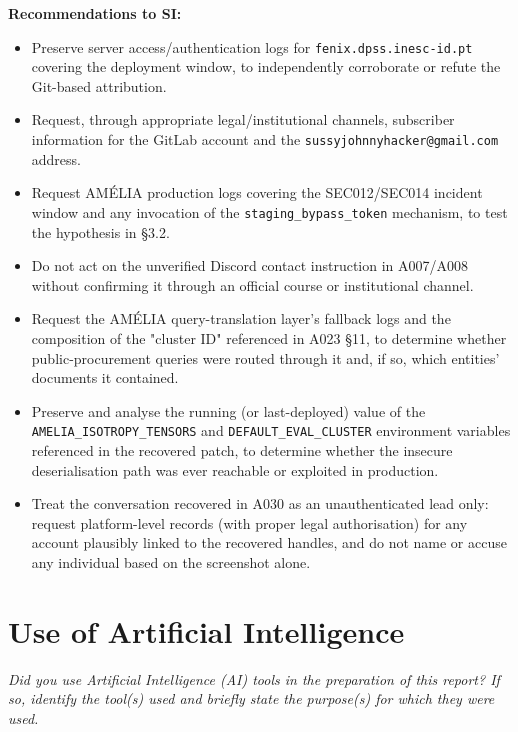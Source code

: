 \documentclass[11pt,a4paper,final,oneside]{article}
\begin{document}
\textbf{Recommendations to SI:}
\begin{itemize}
\item Preserve server access/authentication logs for \texttt{fenix.dpss.inesc-id.pt} covering
  the deployment window, to independently corroborate or refute the Git-based attribution.
\item Request, through appropriate legal/institutional channels, subscriber information for the
  GitLab account and the \texttt{sussyjohnnyhacker@gmail.com} address.
\item Request AMÉLIA production logs covering the SEC012/SEC014 incident window and any
  invocation of the \texttt{staging\_bypass\_token} mechanism, to test the hypothesis in §3.2.
\item Do not act on the unverified Discord contact instruction in A007/A008 without confirming
  it through an official course or institutional channel.
\item Request the AMÉLIA query-translation layer's fallback logs and the composition of the
  "cluster ID" referenced in A023 §11, to determine whether public-procurement queries were
  routed through it and, if so, which entities' documents it contained.
\item Preserve and analyse the running (or last-deployed) value of the
  \texttt{AMELIA\_ISOTROPY\_TENSORS} and \texttt{DEFAULT\_EVAL\_CLUSTER} environment
  variables referenced in the recovered patch, to determine whether the insecure
  deserialisation path was ever reachable or exploited in production.
\item Treat the conversation recovered in A030 as an unauthenticated lead only: request
  platform-level records (with proper legal authorisation) for any account plausibly linked
  to the recovered handles, and do not name or accuse any individual based on the screenshot
  alone.
\end{itemize}

\section{Use of Artificial Intelligence}
\label{sec:ai}

\textit{Did you use Artificial Intelligence (AI) tools in the preparation
of this report? If so, identify the tool(s) used and briefly state the
purpose(s) for which they were used.}
\end{document}
